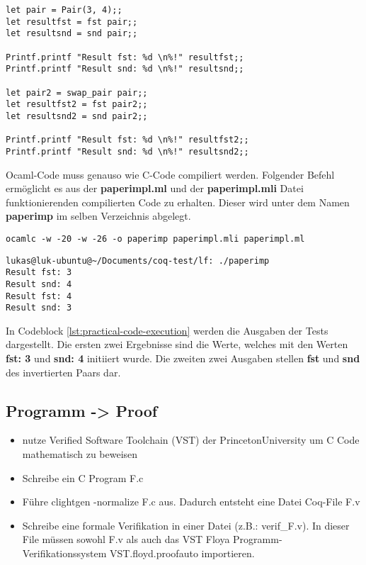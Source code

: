 \begin{lstlisting}[language=coq,firstnumber=1,caption=Ocaml Code anpassen,label=lst:practical-code-adjustment]
let pair = Pair(3, 4);;
let resultfst = fst pair;;
let resultsnd = snd pair;;

Printf.printf "Result fst: %d \n%!" resultfst;;
Printf.printf "Result snd: %d \n%!" resultsnd;;

let pair2 = swap_pair pair;;
let resultfst2 = fst pair2;;
let resultsnd2 = snd pair2;;

Printf.printf "Result fst: %d \n%!" resultfst2;;
Printf.printf "Result snd: %d \n%!" resultsnd2;;
\end{lstlisting}
Ocaml-Code muss genauso wie C-Code compiliert werden. Folgender Befehl ermöglicht es aus der \textbf{paperimpl.ml} und der \textbf{paperimpl.mli} Datei funktionierenden compilierten Code zu erhalten. Dieser wird unter dem Namen \textbf{paperimp} im selben Verzeichnis abgelegt.
\\
\begin{lstlisting}[language=coq,firstnumber=1,caption=Ocaml Code compilieren,label=lst:practical-code-compilation]
ocamlc -w -20 -w -26 -o paperimp paperimpl.mli paperimpl.ml
\end{lstlisting}

\begin{lstlisting}[language=coq,firstnumber=1,caption=Ocaml code ausführen,label=lst:practical-code-execution]
lukas@luk-ubuntu@~/Documents/coq-test/lf: ./paperimp
Result fst: 3 
Result snd: 4 
Result fst: 4 
Result snd: 3 
\end{lstlisting}
In Codeblock \ref{lst:practical-code-execution} werden die Ausgaben der Tests dargestellt. Die ersten zwei Ergebnisse sind die Werte, welches mit den Werten \textbf{fst: 3} und \textbf{snd: 4} initiiert wurde. Die zweiten zwei Ausgaben stellen \textbf{fst} und \textbf{snd} des invertierten Paars dar.

\subsection{Programm -> Proof}
\begin{itemize}
	\item nutze Verified Software Toolchain (VST) der PrincetonUniversity um C Code mathematisch zu beweisen
	\item Schreibe ein C Program F.c
	\item Führe clightgen -normalize F.c aus. Dadurch entsteht eine Datei Coq-File F.v
	\item Schreibe eine formale Verifikation in einer Datei (z.B.: verif\_F.v). In dieser File müssen sowohl F.v als auch das VST Floya Programm-Verifikationssystem VST.floyd.proofauto importieren.\cite{Appel01:VST}
\end{itemize}

